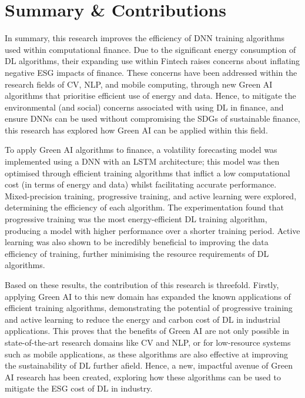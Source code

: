 \documentclass[a4paper, 11pt]{report}
\begin{document}
    \section{Summary \& Contributions}

    In summary, this research improves the efficiency of DNN training algorithms used within computational finance. Due to the significant energy consumption of DL algorithms, their expanding use within Fintech raises concerns about inflating negative ESG impacts of finance. These concerns have been addressed within the research fields of CV, NLP, and mobile computing, through new Green AI algorithms that prioritise efficient use of energy and data. Hence, to mitigate the environmental (and social) concerns associated with using DL in finance, and ensure DNNs can be used without compromising the SDGs of sustainable finance, this research has explored how Green AI can be applied within this field.

    To apply Green AI algorithms to finance, a volatility forecasting model was implemented using a DNN with an LSTM architecture; this model was then optimised through efficient training algorithms that inflict a low computational cost (in terms of energy and data) whilst facilitating accurate performance. Mixed-precision training, progressive training, and active learning were explored, determining the efficiency of each algorithm. The experimentation found that progressive training was the most energy-efficient DL training algorithm, producing a model with higher performance over a shorter training period. Active learning was also shown to be incredibly beneficial to improving the data efficiency of training, further minimising the resource requirements of DL algorithms.

    Based on these results, the contribution of this research is threefold. Firstly, applying Green AI to this new domain has expanded the known applications of efficient training algorithms, demonstrating the potential of progressive training and active learning to reduce the energy and carbon cost of DL in industrial applications. This proves that the benefits of Green AI are not only possible in state-of-the-art research domains like CV and NLP, or for low-resource systems such as mobile applications, as these algorithms are also effective at improving the sustainability of DL further afield. Hence, a new, impactful avenue of Green AI research has been created, exploring how these algorithms can be used to mitigate the ESG cost of DL in industry.
    
\end{document}

